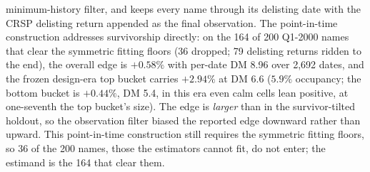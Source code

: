 \documentclass[11pt]{article}
\theoremstyle{remark}
\begin{document}
minimum-history filter, and keeps every name through its delisting
date with the CRSP delisting return appended as the final
observation.
The point-in-time construction addresses survivorship directly: on
the 164 of 200 Q1-2000 names that clear the symmetric fitting floors
(36 dropped; 79 delisting returns ridden to the end), the overall
edge is $+0.58\%$ with per-date DM 8.96 over 2{,}692 dates, and the
frozen design-era top bucket carries $+2.94\%$ at DM 6.6 ($5.9\%$
occupancy; the bottom bucket is $+0.44\%$, DM 5.4, in this era even calm cells lean positive, at one-seventh the top bucket's size).
The edge is \emph{larger} than in the survivor-tilted holdout, so the
observation filter biased the reported edge downward rather than
upward. This point-in-time construction still requires the symmetric
fitting floors, so 36 of the 200 names, those the estimators cannot
fit, do not enter; the estimand is the 164 that clear them.
\end{document}
